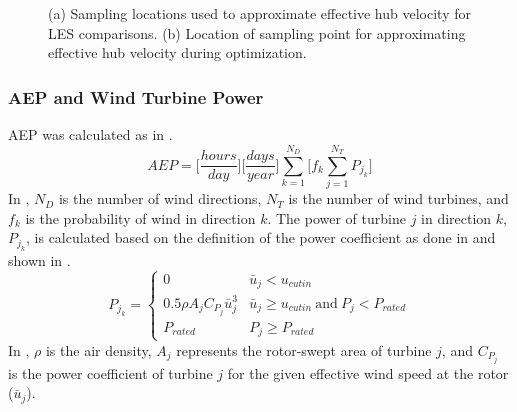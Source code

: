 \documentclass[conf]{new-aiaa}
\begin{document}
\begin{figure}[ht]
	\centering
	\caption{(a) Sampling locations used to approximate effective hub velocity for LES comparisons. (b) Location of sampling point for approximating effective hub velocity during optimization.}
	\label{fig:sampling_locs}
\end{figure}

\subsubsection{AEP and Wind Turbine Power}
AEP was calculated as in .
\begin{equation}
    \label{eq:aep}
    AEP = \bigg[\frac{hours}{day}\bigg]\bigg[\frac{days}{year} \bigg]\sum_{k=1}^{N_D} \bigg[ f_k \sum_{j=1}^{N_T}P_{j_k} \bigg]
\end{equation}
%
In , $N_D$ is the number of wind directions, $N_T$ is the number of wind turbines, and $f_k$ is the probability of wind in direction $k$. The power of turbine $j$ in direction $k$, $P_{j_k}$, is calculated based on the definition of the power coefficient as done in \cite{gebraad2014} and shown in .
%
\begin{equation}\label{eq:power}
    P_{j_k} = 
    \begin{cases} 
      0 & \bar{u}_j < u_{cutin} \\
      0.5\rho A_j C_{P_j}\bar{u}_j^3 & \bar{u}_j \geq  u_{cutin} \ \text{and} \ P_{j} < P_{rated} \\
      P_{rated} & P_{j} \geq P_{rated}
\end{cases}
\end{equation}
%
In , $\rho$ is the air density, $A_j$ represents the rotor-swept area of turbine $j$, and $C_{P_j}$ is the power coefficient of turbine $j$ for the given effective wind speed at the rotor ($\bar{u}_j$).
\end{document}
